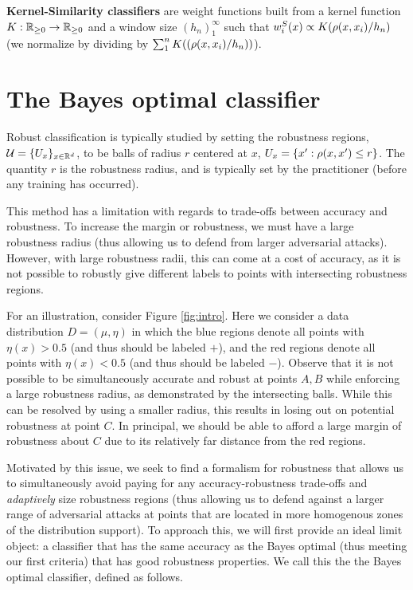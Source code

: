 \textbf{Kernel-Similarity classifiers} are weight functions built from a kernel function $K:\mathbb R_{\geq 0} \to \mathbb R_{\geq 0}$ and a window size $(h_n)_1^\infty$ such that $w_i^S(x) \propto  K(\rho(x, x_i)/h_n)$ (we normalize by dividing by $\sum_1^n K((\rho(x, x_i)/h_n))$).
\section{The \Natural\emph{ }Bayes optimal classifier}

Robust classification is typically studied by setting the robustness regions,  $\mathcal{U} = \{U_x\}_{x \in \mathbb R^d}$, to be balls of radius $r$ centered at $x$, $U_x = \{x': \rho(x, x') \leq r\}$. The quantity $r$ is the robustness radius, and is typically set by the practitioner (before any training has occurred). 

This method has a limitation with regards to trade-offs between accuracy and robustness. To increase the margin or robustness, we must have a large robustness radius (thus allowing us to defend from larger adversarial attacks). However, with large robustness radii, this can come at a cost of accuracy, as it is not possible to robustly give different labels to points with intersecting robustness regions. 

For an illustration, consider Figure \ref{fig:intro}. Here we consider a data distribution $D = (\mu, \eta)$ in which the blue regions denote all points with $\eta(x) > 0.5$ (and thus should be labeled $+$), and the red regions denote all points with $\eta(x) < 0.5$ (and thus should be labeled $-$). Observe that it is not possible to be simultaneously accurate and robust at points $A, B$ while enforcing a large robustness radius, as demonstrated by the intersecting balls. While this can be resolved by using a smaller radius, this results in losing out on potential robustness at point $C$. In principal, we should be able to afford a large margin of robustness about $C$ due to its relatively far distance from the red regions. 

Motivated by this issue, we seek to find a formalism for robustness that allows us to simultaneously avoid paying for any accuracy-robustness trade-offs and \textit{adaptively} size robustness regions (thus allowing us to defend against a larger range of adversarial attacks at points that are located in more homogenous zones of the distribution support). To approach this, we will first provide an ideal limit object: a classifier that has the same accuracy as the Bayes optimal (thus meeting our first criteria) that has good robustness properties. We call this the the \natural\emph{ }Bayes optimal classifier, defined as follows.

